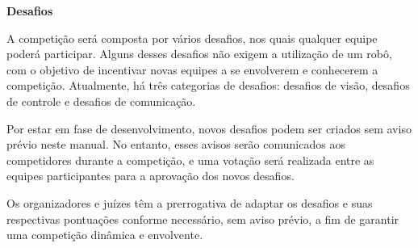 \clearpage
\sffamily
{\bfseries\color[rgb]{0.4,0.4,0.4}Desafios}
{}

\bigskip

A competição será composta por vários desafios, nos quais qualquer equipe poderá participar. Alguns desses desafios não exigem a utilização de um robô, com o objetivo de incentivar novas equipes a se envolverem e conhecerem a competição. Atualmente, há três categorias de desafios: desafios de visão, desafios de controle e desafios de comunicação.

Por estar em fase de desenvolvimento, novos desafios podem ser criados sem aviso prévio neste manual. No entanto, esses avisos serão comunicados aos competidores durante a competição, e uma votação será realizada entre as equipes participantes para a aprovação dos novos desafios.

Os organizadores e juízes têm a prerrogativa de adaptar os desafios e suas respectivas pontuações conforme necessário, sem aviso prévio, a fim de garantir uma competição dinâmica e envolvente.